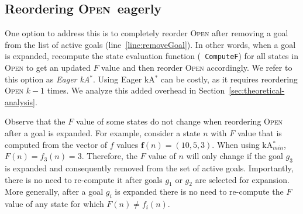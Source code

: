 \documentclass{aicom2e}
\newcommand{\kgs}{$k$GP}
\newcommand{\kastar}{kA$^*$}
\newcommand{\kastarmin}{kA$^*_{min}$}
\newcommand{\kastarmax}{kA$^*_{max}$}
\newcommand{\open}{\textsc{Open}}
\begin{document}







\subsection{Reordering \open\ eagerly}
\label{sec:eager}
One option to address this is to completely reorder \open{} after removing a
goal from the list of active goals (line~\ref{line:removeGoal}). In other
words, when a goal is expanded, recompute the state evaluation function ({\tt
ComputeF}) for all states in \open{} to get an updated $F$ value and then
reorder \open{} accordingly. We refer to this option as {\em Eager \kastar{}}.
Using Eager \kastar{} can be costly, as it requires reordering \open{} $k-1$
times. We analyze this added overhead in Section~\ref{sec:theoretical-analysis}.


Observe that the $F$ value of some states do not change when reordering \open{}
after a goal is expanded. For example, consider a state $n$ with $F$ value that
is computed from the vector of $f$ values $\textbf{f}(n)=(10,5,3)$. When using
\kastarmin{}, $F(n)=f_3(n)=3$. Therefore, the $F$ value of $n$ will only change
if the goal $g_3$ is expanded and consequently removed from the set of active
goals. Importantly, there is no need to re-compute it after goals $g_1$ or
$g_2$ are selected for expansion. More generally, after a goal $g_i$ is
expanded there is no need to re-compute the $F$ value of any state for which
$F(n)\neq f_i(n)$.
\end{document}
